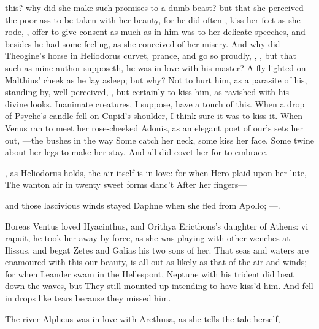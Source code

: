 this? why did she make such promises to a dumb beast? but that she
perceived the poor ass to be taken with her beauty, for he did often
, kiss her feet as she rode,
, offer to give consent as
much as in him was to her delicate speeches, and besides he had some
feeling, as she conceived of her misery. And why did Theogine's horse
in Heliodorus curvet, prance, and go so proudly, , \etc{}, but that such as mine author supposeth,
he was in love with his master?  A fly lighted on  Malthius'
cheek as he lay asleep; but why? Not to hurt him, as a parasite of his,
standing by, well perceived, , but
certainly to kiss him, as ravished with his divine looks. Inanimate
creatures, I suppose, have a touch of this. When a drop of
Psyche's candle fell on Cupid's shoulder, I think sure it was to
kiss it. When Venus ran to meet her rose-cheeked Adonis, as an elegant
poet of our's sets her out,
---the bushes in the way
Some catch her neck, some kiss her face,
Some twine about her legs to make her stay,
And all did covet her for to embrace.

, as Heliodorus holds, the air itself is in
love: for when Hero plaid upon her lute,
The wanton air in twenty sweet forms danc't
After her fingers---

and those lascivious winds stayed Daphne when she fled from Apollo;
---.

Boreas Ventus loved Hyacinthus, and Orithya Ericthons's daughter of
Athens: vi rapuit, \etc{} he took her away by force, as she was playing
with other wenches at Ilissus, and begat Zetes and Galias his two sons
of her. That seas and waters are enamoured with this our beauty, is all
out as likely as that of the air and winds; for when Leander swam in
the Hellespont, Neptune with his trident did beat down the waves, but
They still mounted up intending to have kiss'd him.
And fell in drops like tears because they missed him.

The river Alpheus was in love with Arethusa, as she tells the
tale herself,

